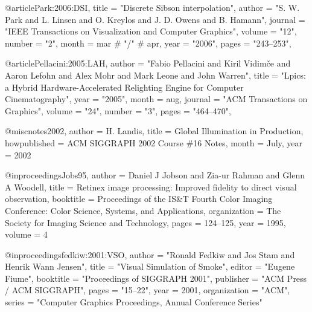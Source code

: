 @article{Park:2006:DSI,
    title = "Discrete Sibson interpolation",
    author = "S. W. Park and L. Linsen and O. Kreylos and J. D. Owens and B. Hamann",
    journal = "IEEE Transactions on Visualization and Computer Graphics",
    volume = "12",
    number = "2",
    month = mar # "\slash " # apr, 
    year = "2006",
    pages = "243--253",
  }

@article{Pellacini:2005:LAH,
  author = "Fabio Pellacini and Kiril Vidim{\v{c}}e and Aaron Lefohn
      and Alex Mohr and Mark Leone and John Warren",
  title = "Lpics: a Hybrid Hardware-Accelerated Relighting
    Engine for Computer Cinematography",
  year = "2005",
  month = aug,
  journal = "ACM Transactions on Graphics",
  volume = "24",
  number = "3",
  pages = "464--470",
}

@misc{notes2002,
  author = {H. Landis},
  title = {Global Illumination in Production},
  howpublished = {ACM SIGGRAPH 2002 Course \#16 Notes},
  month = {July},
  year = {2002}
}

@inproceedings{Jobs95,
  author    = {Daniel J Jobson and {Zia-ur} Rahman and Glenn A Woodell},
  title     = {Retinex image processing: Improved fidelity to direct visual
observation},
  booktitle = {Proceedings of the IS\&T Fourth Color Imaging Conference: Color
Science, Systems, and Applications},
  organization = {The Society for Imaging Science and Technology},
  pages     = {124--125},
  year      = {1995},
  volume    = {4}
}

@inproceedings{fedkiw:2001:VSO,
  author = "Ronald Fedkiw and Jos Stam and Henrik Wann Jensen",
  title = "Visual Simulation of Smoke",
  editor = "Eugene Fiume",
  booktitle = "Proceedings of SIGGRAPH 2001",
  publisher = "ACM Press / ACM SIGGRAPH",
  pages = "15--22",
  year = 2001,
  organization = "ACM",
  series = "Computer Graphics Proceedings, Annual Conference Series"
}

